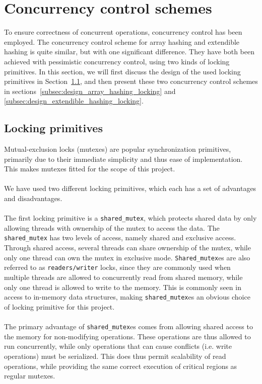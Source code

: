 \documentclass[11pt]{report} %
\begin{document}
\section{Concurrency control schemes}
\label{sec:design_concurrency_control_scheme}
To ensure correctness of concurrent operations, concurrency control has been employed. The concurrency control scheme for array hashing and extendible hashing is quite similar, but with one significant difference. They have both been achieved with pessimistic concurrency control, using two kinds of locking primitives. In this section, we will first discuss the design of the used locking primitives in Section~\ref{subsec:design_locking_primitives}, and then present these two concurrency control schemes in sections~\ref{subsec:design_array_hashing_locking} and \ref{subsec:design_extendible_hashing_locking}.
\subsection{Locking primitives}
\label{subsec:design_locking_primitives}
Mutual-exclusion locks (mutexes) are popular synchronization primitives, primarily due to their immediate simplicity and thus ease of implementation. This makes mutexes fitted for the scope of this project. \\
\\
We have used two different locking primitives, which each has a set of advantages and disadvantages.\\
\\
The first locking primitive is a \verb|shared_mutex|, which protects shared data by only allowing threads with ownership of the mutex to access the data. The \verb|shared_mutex| has two levels of access, namely shared and exclusive access. Through shared access, several threads can share ownership of the mutex, while only one thread can own the mutex in exclusive mode. \verb|Shared_mutex|es are also referred to as \verb|readers/writer| locks, since they are commonly used when multiple threads are allowed to concurrently read from shared memory, while only one thread is allowed to write to the memory. This is commonly seen in access to in-memory data structures, making \verb|shared_mutex|es an obvious choice of locking primitive for this project.\\
\\
The primary advantage of \verb|shared_mutex|es comes from allowing shared access to the memory for non-modifying operations. These operations are thus allowed to run concurrently, while only operations that can cause conflicts (i.e. write operations) must be serialized. This does thus permit scalability of read operations, while providing the same correct execution of critical regions as regular mutexes. \\
\end{document}
